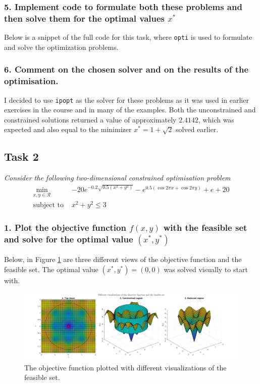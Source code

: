 \documentclass[letterpaper,12pt]{article}
\begin{document}
\subsubsection*{5. Implement code to formulate both these problems and then solve them for the optimal values $x^*$}
Below is a snippet of the full code for this task, where \texttt{opti} is used to formulate and solve the optimization problems. 


\subsubsection*{6. Comment on the chosen solver and on the results of the optimisation.}
I decided to use \texttt{ipopt} as the solver for these problems as it was used in earlier exercises in the course and in many of the examples. Both the unconstrained and constrained solutions returned a value of approximately $2.4142$, which was expected and also equal to the minimizer $x^* = 1 + \sqrt{2}$ solved earlier.

\subsection*{Task 2}
\textit{Consider the following two-dimensional constrained optimisation problem}
\begin{equation}
\begin{aligned}
	\min_{x,y \in \mathcal{R}} &-20e^{-0.2\sqrt{0.5(x^2 + y^2)}} - e^{0.5(\cos 2\pi x + \cos 2\pi y)} + e + 20 \\
	\text{subject to } &x^2 + y^2 \leq 3
\end{aligned}
\end{equation}
\subsubsection*{1. Plot the objective function $f(x,y)$ with the feasible set and solve for the optimal value $(x^*,y^*)$}
Below, in Figure \ref{img:2-2-visual} are three different views of the objective function and the feasible set. The optimal value $(x^*,y^*) = (0,0)$ was solved visually to start with.
\begin{figure}[!htbp]
	\centering
	\includegraphics[width=1\textwidth]{img/2-2.png}
	\caption{The objective function plotted with different visualizations of the feasible set.}
	\label{img:2-2-visual}
\end{figure}
\end{document}
